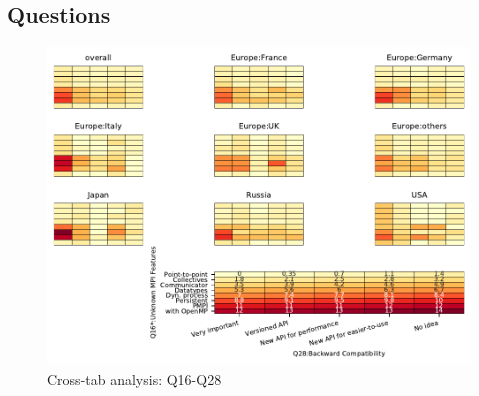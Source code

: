 
\subsection{Questions}


\begin{figure}
\begin{center}
\includegraphics[width=12cm]{../pdfs/Q16-Q28.pdf}
\caption{Cross-tab analysis: Q16-Q28}
\label{fig:Q16-Q28}
\end{center}
\end{figure}
